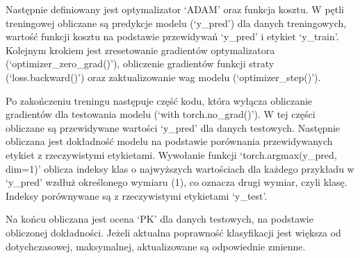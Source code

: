 \documentclass[a4paper]{article}
\begin{document}
Następnie definiowany jest optymalizator `ADAM' oraz funkcja kosztu.
W pętli treningowej obliczane są predykcje modelu (`y\_pred') dla danych treningowych, wartość funkcji kosztu na podstawie przewidywań `y\_pred' i etykiet `y\_train'.
Kolejnym krokiem jest zresetowanie gradientów optymalizatora (`optimizer\_zero\_grad()'), obliczenie gradientów funkcji straty (`loss.backward()') oraz zaktualizowanie wag modelu (`optimizer\_step()').

Po zakończeniu treningu następuje część kodu, która wyłącza obliczanie gradientów dla testowania modelu (`with torch.no\_grad()').
W tej części obliczane są przewidywane wartości `y\_pred' dla danych testowych.
Następnie obliczana jest dokładność modelu na podstawie porównania przewidywanych etykiet z rzeczywistymi etykietami.
Wywołanie funkcji `torch.argmax(y\_pred, dim=1)' oblicza indeksy klas o najwyższych wartościach dla każdego przykładu w `y\_pred' wzdłuż określonego wymiaru (1), co oznacza drugi wymiar, czyli klasę.
Indeksy porównywane są z rzeczywistymi etykietami `y\_test'.

Na końcu obliczana jest ocena `PK' dla danych testowych, na podstawie obliczonej dokładności.
Jeżeli aktualna poprawność klasyfikacji jest większa od dotychczasowej, maksymalnej, aktualizowane są odpowiednie zmienne.
\end{document}
